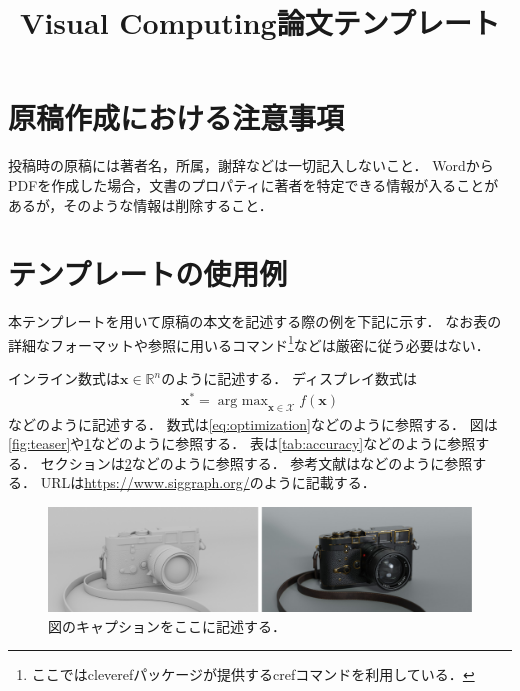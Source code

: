 \documentclass[anonymous]{vc}
\title{Visual Computing論文テンプレート}
\begin{document}
\maketitle


\section{原稿作成における注意事項}

投稿時の原稿には著者名，所属，謝辞などは一切記入しないこと．
WordからPDFを作成した場合，文書のプロパティに著者を特定できる情報が入ることがあるが，そのような情報は削除すること．

\section{テンプレートの使用例}
\label{sec:template}

本テンプレートを用いて原稿の本文を記述する際の例を下記に示す．
なお表の詳細なフォーマットや参照に用いるコマンド\footnote{ここでは\textsf{cleveref}パッケージが提供する\textsf{cref}コマンド\cite{Wikibooks:LaTeX:Ref}を利用している．}などは厳密に従う必要はない．

インライン数式は$\mathbf{x} \in \mathbb{R}^{n}$のように記述する．
ディスプレイ数式は
\begin{align}
  \mathbf{x}^{*} = \mathop{\text{arg max}}_{\mathbf{x} \in \mathcal{X}} f(\mathbf{x})
  \label{eq:optimization}
\end{align}
などのように記述する．
数式は\cref{eq:optimization}などのように参照する．
図は\cref{fig:teaser}や\cref{fig:leica}などのように参照する．
表は\cref{tab:accuracy}などのように参照する．
セクションは\cref{sec:template}などのように参照する．
参考文献は\cite{GSC12,WL00}などのように参照する．
URLは\url{https://www.siggraph.org/}のように記載する．

\begin{figure}
  \centering
  \includegraphics[width=\columnwidth]{./figures/leica.pdf}
  \caption{図のキャプションをここに記述する．}
  \label{fig:leica}
\end{figure}
\end{document}
